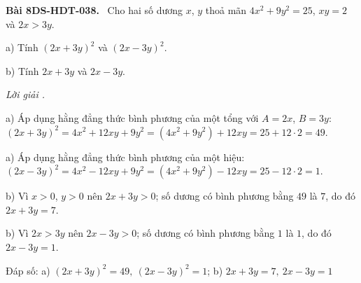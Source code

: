 \documentclass[12pt,a4paper]{article}
\newenvironment{problem}[1][]{\par\medskip\noindent\textbf{Bài #1.}\ }{\par}
\newenvironment{solution}[1][]{\par\noindent\textit{Lời giải #1.}\par}{\par}
\begin{document}
\begin{problem}[8DS-HDT-038]
Cho hai số dương $x$, $y$ thoả mãn $4x^2 + 9y^2 = 25$, $xy = 2$ và $2x > 3y$.

a) Tính $(2x + 3y)^2$ và $(2x - 3y)^2$.

b) Tính $2x + 3y$ và $2x - 3y$.

\begin{solution}
a) Áp dụng hằng đẳng thức bình phương của một tổng với $A = 2x$, $B = 3y$: $(2x + 3y)^2 = 4x^2 + 12xy + 9y^2 = (4x^2 + 9y^2) + 12xy = 25 + 12 \cdot 2 = 49$.

a) Áp dụng hằng đẳng thức bình phương của một hiệu: $(2x - 3y)^2 = 4x^2 - 12xy + 9y^2 = (4x^2 + 9y^2) - 12xy = 25 - 12 \cdot 2 = 1$.

b) Vì $x > 0$, $y > 0$ nên $2x + 3y > 0$; số dương có bình phương bằng $49$ là $7$, do đó $2x + 3y = 7$.

b) Vì $2x > 3y$ nên $2x - 3y > 0$; số dương có bình phương bằng $1$ là $1$, do đó $2x - 3y = 1$.

Đáp số: a) $\boxed{(2x + 3y)^2 = 49,\ (2x - 3y)^2 = 1}$; b) $\boxed{2x + 3y = 7,\ 2x - 3y = 1}$
\end{solution}
\end{problem}
\end{document}
